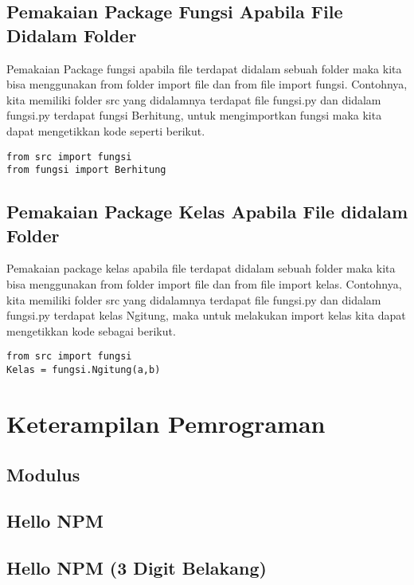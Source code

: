 \subsection{Pemakaian Package Fungsi Apabila File Didalam Folder}
Pemakaian Package fungsi apabila file terdapat didalam sebuah folder maka kita bisa menggunakan from folder import file dan from file import fungsi. Contohnya, kita memiliki folder src yang didalamnya terdapat file fungsi.py dan didalam fungsi.py terdapat fungsi Berhitung, untuk mengimportkan fungsi maka kita dapat mengetikkan kode seperti berikut.
\begin{verbatim}
from src import fungsi
from fungsi import Berhitung
\end{verbatim}

\subsection{Pemakaian Package Kelas Apabila File didalam Folder}
Pemakaian package kelas apabila file terdapat didalam sebuah folder maka kita bisa menggunakan from folder import file dan from file import kelas. Contohnya, kita memiliki folder src yang didalamnya terdapat file fungsi.py dan didalam fungsi.py terdapat kelas Ngitung, maka untuk melakukan import kelas kita dapat mengetikkan kode sebagai berikut.
\begin{verbatim}
from src import fungsi
Kelas = fungsi.Ngitung(a,b)
\end{verbatim}

\section{Keterampilan Pemrograman}
\subsection{Modulus}

\subsection{Hello NPM}

\subsection{Hello NPM (3 Digit Belakang)}

